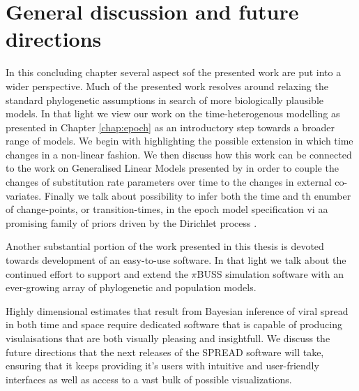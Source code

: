 \chapter{General discussion and future directions}

In this concluding chapter several aspect sof the presented work are put into a wider perspective.
Much of the presented work resolves around relaxing the standard phylogenetic assumptions in search of more biologically plausible models. 
In that light we view our work on the time-heterogenous modelling as presented in Chapter \ref{chap:epoch} as an introductory step towards a broader range of models.
We begin with highlighting the possible extension in which time changes in a non-linear fashion.
We then discuss how this work can be connected to the work on Generalised Linear Models presented by \citet{Lemey2014} in order to couple the changes of substitution rate parameters over time to the changes in external co-variates.
Finally we talk about possibility to infer both the time and th enumber of change-points, or transition-times, in the epoch model specification vi aa promising family of priors driven by the Dirichlet process \citep{Ferguson1973}. 

Another substantial portion of the work presented in this thesis is devoted towards development of an easy-to-use software.
In that light we talk about the continued effort to support and extend the $\pi$BUSS simulation software \citep{bielejec2014} with an ever-growing array of phylogenetic and population models.

Highly dimensional estimates that result from Bayesian inference of viral spread in both time and space require dedicated software that is capable of producing visulaisations that are both visually pleasing and insightfull.
We discuss the future directions that the next releases of the SPREAD software \citep{Bielejec2011} will take, ensuring that it keeps providing it's users with intuitive and user-friendly interfaces as well as access to a vast bulk of possible visualizations.


